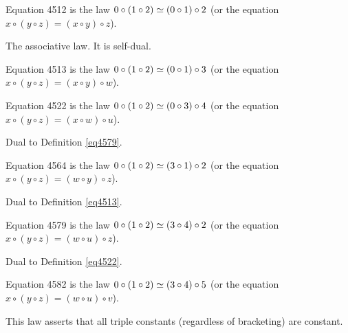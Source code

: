 \begin{definition}[Equation 4512]\label{eq4512}\leanok{}  Equation 4512 is the law $0 \circ (1 \circ 2)  \simeq  (0 \circ 1) \circ 2$ (or the equation $x \circ (y \circ z) = (x \circ y) \circ z$).
\end{definition}

The associative law. It is self-dual.

\begin{definition}[Equation 4513]\label{eq4513}\leanok{}  Equation 4513 is the law $0 \circ (1 \circ 2)  \simeq  (0 \circ 1) \circ 3$ (or the equation $x \circ (y \circ z) = (x \circ y) \circ w$).
\end{definition}

\begin{definition}[Equation 4522]\label{eq4522}\leanok{}  Equation 4522 is the law $0 \circ (1 \circ 2)  \simeq  (0 \circ 3) \circ 4$ (or the equation $x \circ (y \circ z) = (x \circ w) \circ u$).
\end{definition}

Dual to Definition \ref{eq4579}.

\begin{definition}[Equation 4564]\label{eq4564}\leanok{}  Equation 4564 is the law $0 \circ (1 \circ 2)  \simeq  (3 \circ 1) \circ 2$ (or the equation $x \circ (y \circ z) = (w \circ y) \circ z$).
\end{definition}

Dual to Definition \ref{eq4513}.

\begin{definition}[Equation 4579]\label{eq4579}\leanok{}  Equation 4579 is the law $0 \circ (1 \circ 2)  \simeq  (3 \circ 4) \circ 2$ (or the equation $x \circ (y \circ z) = (w \circ u) \circ z$).
\end{definition}

Dual to Definition \ref{eq4522}.

\begin{definition}[Equation 4582]\label{eq4582}\leanok{}  Equation 4582 is the law $0 \circ (1 \circ 2)  \simeq  (3 \circ 4) \circ 5$ (or the equation $x \circ (y \circ z) = (w \circ u) \circ v$).
\end{definition}

This law asserts that all triple constants (regardless of bracketing) are constant.

